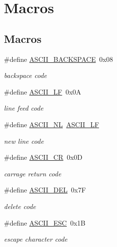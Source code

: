 \hypertarget{group__macros}{}\section{Macros}
\label{group__macros}
\subsection*{Macros}
\begin{DoxyCompactItemize}
\item 
\#define \hyperlink{group__macros_ga97f70a2430c640e184380e20e1c1d0ea}{A\+S\+C\+I\+I\+\_\+\+B\+A\+C\+K\+S\+P\+A\+C\+E}~0x08
\begin{DoxyCompactList}\small\item\em backspace code \end{DoxyCompactList}\item 
\#define \hyperlink{group__macros_gaca3b498f5936dbe4f3076a47c3e1810d}{A\+S\+C\+I\+I\+\_\+\+L\+F}~0x0\+A
\begin{DoxyCompactList}\small\item\em line feed code \end{DoxyCompactList}\item 
\#define \hyperlink{group__macros_gae8dca46e124869f824f23b0759fda4cb}{A\+S\+C\+I\+I\+\_\+\+N\+L}~\hyperlink{group__macros_gaca3b498f5936dbe4f3076a47c3e1810d}{A\+S\+C\+I\+I\+\_\+\+L\+F}
\begin{DoxyCompactList}\small\item\em new line code \end{DoxyCompactList}\item 
\#define \hyperlink{group__macros_ga089ed4925403ab02a05e603967c74579}{A\+S\+C\+I\+I\+\_\+\+C\+R}~0x0\+D
\begin{DoxyCompactList}\small\item\em carrage return code \end{DoxyCompactList}\item 
\#define \hyperlink{group__macros_ga3bb28e223b7c203113dc8c0387d43b36}{A\+S\+C\+I\+I\+\_\+\+D\+E\+L}~0x7\+F
\begin{DoxyCompactList}\small\item\em delete code \end{DoxyCompactList}\item 
\#define \hyperlink{group__macros_gaf499a0b34ddf61832ae3dab05677ac7b}{A\+S\+C\+I\+I\+\_\+\+E\+S\+C}~0x1\+B
\begin{DoxyCompactList}\small\item\em escape character code \end{DoxyCompactList}\item 

\end{DoxyCompactItemize}
